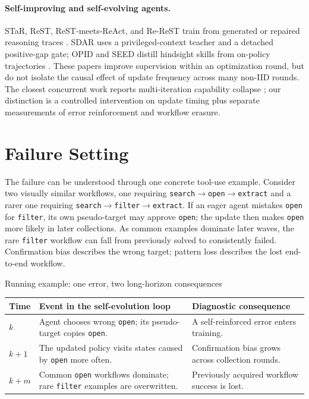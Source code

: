 \documentclass[10pt]{article}
\begin{document}
\paragraph{Self-improving and self-evolving agents.}
STaR, ReST, ReST-meets-ReAct, and Re-ReST train from generated or repaired
reasoning traces \citep{zelikman2022star,gulcehre2023rest,
aksitov2023restreact,dou2024rerest}.  SDAR uses a privileged-context teacher
and a detached positive-gap gate; OPID and SEED distill hindsight skills from
on-policy trajectories \citep{lu2026sdar,yang2026opid,wu2026seed}.  These
papers improve supervision within an optimization round, but do not isolate
the causal effect of update frequency across many non-IID rounds.  The closest
concurrent work reports multi-iteration capability collapse
\citep{chen2026internalization}; our distinction is a controlled intervention
on update timing plus separate measurements of error reinforcement and
workflow erasure.

\section{Failure Setting}
\label{sec:setting}

The failure can be understood through one concrete tool-use example.  Consider
two visually similar workflows, one requiring
\texttt{search$\rightarrow$open$\rightarrow$extract} and a rarer one requiring
\texttt{search$\rightarrow$filter$\rightarrow$extract}.  If an eager agent
mistakes \texttt{open} for \texttt{filter}, its own pseudo-target may approve
\texttt{open}; the update then makes \texttt{open} more likely in later
collections.  As common examples dominate later waves, the rare
\texttt{filter} workflow can fall from previously solved to consistently
failed.  Confirmation bias describes the wrong target; pattern loss describes
the lost end-to-end workflow.

\begin{storybox}{Running example: one error, two long-horizon consequences}
\begin{tabularx}{\textwidth}{p{1.15cm}Xp{3.6cm}}
\toprule
Time & Event in the self-evolution loop & Diagnostic consequence\\
\midrule
$k$ & Agent chooses wrong \texttt{open}; its pseudo-target copies
\texttt{open}. & A self-reinforced error enters training.\\
$k+1$ & The updated policy visits states caused by \texttt{open} more often. &
Confirmation bias grows across collection rounds.\\
$k+m$ & Common \texttt{open} workflows dominate; rare \texttt{filter}
examples are overwritten. & Previously acquired workflow success is lost.\\
\bottomrule
\end{tabularx}
\end{storybox}
\end{document}
